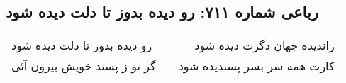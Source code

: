 \begin{center}
\section*{رباعی شماره ۷۱۱: رو دیده بدوز تا دلت دیده شود}
\label{sec:0711}
\begin{longtable}{l p{0.5cm} r}
رو دیده بدوز تا دلت دیده شود
&&
زاندیده جهان دگرت دیده شود
\\
گر تو ز پسند خویش بیرون آئی
&&
کارت همه سر بسر پسندیده شود
\\
\end{longtable}
\end{center}
